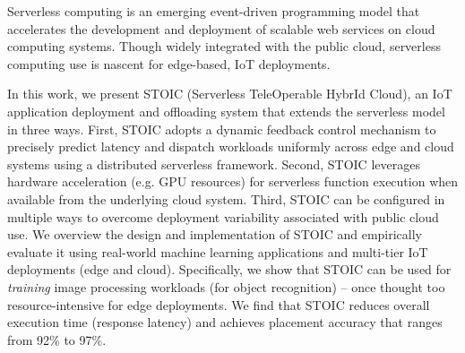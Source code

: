 Serverless computing is an emerging event-driven programming model that accelerates the development and deployment of scalable web services on cloud computing systems. Though widely integrated with the public cloud, serverless computing 
use is nascent for edge-based, IoT deployments.

In this work, we present STOIC (Serverless TeleOperable HybrId Cloud), an IoT application deployment and offloading system that extends the serverless model in three ways. First, STOIC adopts a dynamic feedback control mechanism to precisely predict latency and dispatch workloads uniformly across edge and cloud systems using a distributed serverless framework. Second, STOIC leverages hardware acceleration (e.g. GPU resources) for serverless function execution when available from the underlying cloud system. Third, STOIC can be configured in multiple ways to overcome deployment variability associated with public cloud use. We overview the design and implementation of STOIC and empirically evaluate it using real-world machine learning applications and multi-tier IoT deployments (edge and cloud). Specifically, we show that STOIC can be used for \textit{training} image processing workloads (for object recognition) -- once thought too resource-intensive for edge deployments. We find that STOIC reduces overall execution time (response latency) and achieves placement accuracy that ranges from 92\% to 97\%.
